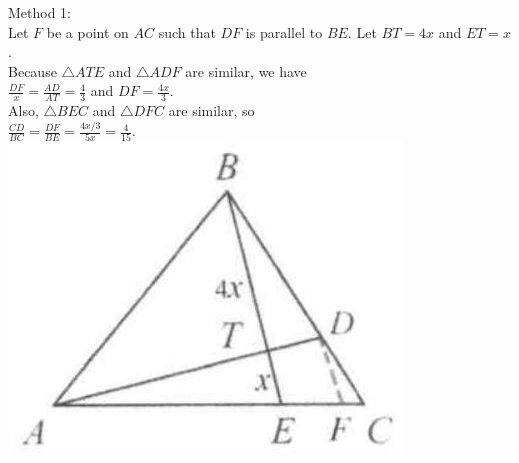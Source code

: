 \documentclass{article}
\begin{document}
Method 1:\\
Let \(F\) be a point on \(A C\) such that \(D F\) is parallel to \(B E\). Let \(B T=4 x\) and \(E T=x\).\\
Because \(\triangle A T E\) and \(\triangle A D F\) are similar, we have\\
\(\frac{D F}{x}=\frac{A D}{A T}=\frac{4}{3}\) and \(D F=\frac{4 x}{3}\).\\
Also, \(\triangle B E C\) and \(\triangle D F C\) are similar, so\\
\(\frac{C D}{B C}=\frac{D F}{B E}=\frac{4 x / 3}{5 x}=\frac{4}{15}\).\\
\centering
\includegraphics[width=\textwidth]{images/104(1).jpg}
\end{document}
